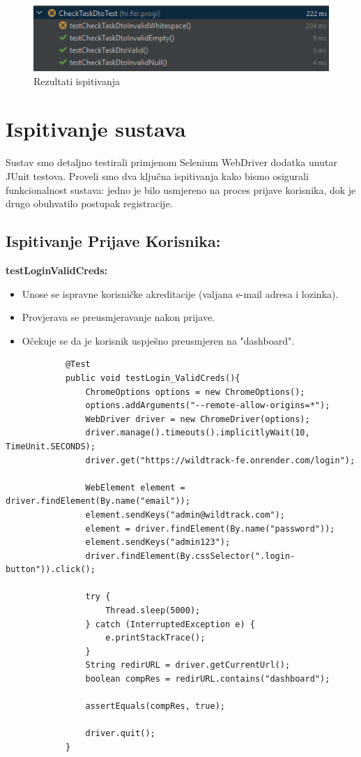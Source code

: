 			\begin{figure}[H]
				\includegraphics[scale=1]{slike/checkTaskDtoTest.png} 
				\centering
				\caption{Rezultati ispitivanja}
				\label{fig:promjene}
			\end{figure}
			
			
			\section{Ispitivanje sustava}
			
			
			Sustav smo detaljno testirali primjenom Selenium WebDriver dodatka unutar JUnit testova. Proveli smo dva ključna ispitivanja kako bismo osigurali funkcionalnost sustava: jedno je bilo usmjereno na proces prijave korisnika, dok je drugo obuhvatilo postupak registracije.
			
			\subsection{Ispitivanje Prijave Korisnika:}
			\textbf{testLoginValidCreds:}
			\begin{itemize}
				\item Unose se ispravne korisničke akreditacije (valjana e-mail adresa i lozinka).
				\item Provjerava se preusmjeravanje nakon prijave.
				\item Očekuje se da je korisnik uspješno preusmjeren na "dashboard".
			\end{itemize}
			\begin{lstlisting}
			@Test
			public void testLogin_ValidCreds(){
				ChromeOptions options = new ChromeOptions();
				options.addArguments("--remote-allow-origins=*");
				WebDriver driver = new ChromeDriver(options);
				driver.manage().timeouts().implicitlyWait(10, TimeUnit.SECONDS);
				driver.get("https://wildtrack-fe.onrender.com/login");
				
				WebElement element = driver.findElement(By.name("email"));
				element.sendKeys("admin@wildtrack.com");
				element = driver.findElement(By.name("password"));
				element.sendKeys("admin123");
				driver.findElement(By.cssSelector(".login-button")).click();
				
				try {
					Thread.sleep(5000);
				} catch (InterruptedException e) {
					e.printStackTrace();
				}
				String redirURL = driver.getCurrentUrl();
				boolean compRes = redirURL.contains("dashboard");
				
				assertEquals(compRes, true);
				
				driver.quit();
			}
			\end{lstlisting}
			
